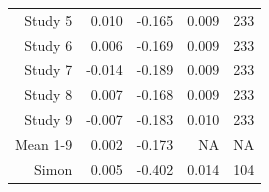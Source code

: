 \begin{table}[!h]
{\begin{tabular}[t]{rrrrr}
\hspace{1em}Study 5 & 0.010 & -0.165 & 0.009 & 233\\
\hspace{1em}Study 6 & 0.006 & -0.169 & 0.009 & 233\\
\hspace{1em}Study 7 & -0.014 & -0.189 & 0.009 & 233\\
\hspace{1em}Study 8 & 0.007 & -0.168 & 0.009 & 233\\
\hspace{1em}Study 9 & -0.007 & -0.183 & 0.010 & 233\\
\hspace{1em}Mean 1-9 & 0.002 & -0.173 & NA & NA\\
\hspace{1em}Simon & 0.005 & -0.402 & 0.014 & 104\\
\bottomrule
\end{tabular}}
\end{table}
